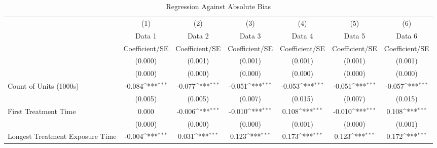 \begin{table}[htbp]\centering
\def\sym#1{\ifmmode^{#1}\else\(^{#1}\)\fi}
\caption{Regression Against Absolute Bias}
\begin{tabular}{l*{6}{c}}
\hline\hline
                    &\multicolumn{1}{c}{(1)}&\multicolumn{1}{c}{(2)}&\multicolumn{1}{c}{(3)}&\multicolumn{1}{c}{(4)}&\multicolumn{1}{c}{(5)}&\multicolumn{1}{c}{(6)}\\
                    &\multicolumn{1}{c}{Data 1}&\multicolumn{1}{c}{Data 2}&\multicolumn{1}{c}{Data 3}&\multicolumn{1}{c}{Data 4}&\multicolumn{1}{c}{Data 5}&\multicolumn{1}{c}{Data 6}\\
                    &Coefficient/SE         &Coefficient/SE         &Coefficient/SE         &Coefficient/SE         &Coefficient/SE         &Coefficient/SE         \\
\hline
                    &     (0.000)         &     (0.001)         &     (0.001)         &     (0.001)         &     (0.001)         &     (0.001)         \\
                    &     (0.000)         &     (0.000)         &     (0.000)         &     (0.000)         &     (0.000)         &     (0.000)         \\
Count of Units (1000s)&      -0.084\sym{***}&      -0.077\sym{***}&      -0.051\sym{***}&      -0.053\sym{***}&      -0.051\sym{***}&      -0.057\sym{***}\\
                    &     (0.005)         &     (0.005)         &     (0.007)         &     (0.015)         &     (0.007)         &     (0.015)         \\
First Treatment Time&       0.000         &      -0.006\sym{***}&      -0.010\sym{***}&       0.108\sym{***}&      -0.010\sym{***}&       0.108\sym{***}\\
                    &     (0.000)         &     (0.000)         &     (0.000)         &     (0.001)         &     (0.000)         &     (0.001)         \\
Longest Treatment Exposure Time&      -0.004\sym{***}&       0.031\sym{***}&       0.123\sym{***}&       0.173\sym{***}&       0.123\sym{***}&       0.172\sym{***}\\

\end{tabular}
\end{table}
